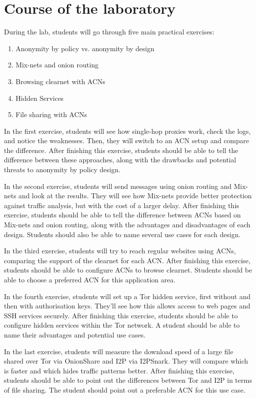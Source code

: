 \section{Course of the laboratory}
During the lab, students will go through five main practical exercises:
\begin{enumerate}
    \item Anonymity by policy vs. anonymity by design
    \item Mix-nets and onion routing
    \item Browsing clearnet with ACNs
    \item Hidden Services
    \item File sharing with ACNs
\end{enumerate}

In the first exercise, students will see how single-hop proxies work, check the logs, and notice the weaknesses. Then, they will switch to an ACN setup and compare the difference. After finishing this exercise, students should be able to tell the difference between these approaches, along with the drawbacks and potential threats to anonymity by policy design.

In the second exercise, students will send messages using onion routing and Mix-nets and look at the results. They will see how Mix-nets provide better protection against traffic analysis, but with the cost of a larger delay. After finishing this exercise, students should be able to tell the difference between ACNs based on Mix-nets and onion routing, along with the advantages and disadvantages of each design. Students should also be able to name several use cases for each design.

In the third exercise, students will try to reach regular websites using ACNs, comparing the support of the clearnet for each ACN. After finishing this exercise, students should be able to configure ACNs to browse clearnet. Students should be able to choose a preferred ACN for this application area.

In the fourth exercise, students will set up a Tor hidden service, first without and then with authorisation keys. They’ll see how this allows access to web pages and SSH services securely. After finishing this exercise, students should be able to configure hidden services within the Tor network. A student should be able to name their advantages and potential use cases.

In the last exercise, students will measure the download speed of a large file shared over Tor via OnionShare and I2P via I2PSnark. They will compare which is faster and which hides traffic patterns better. After finishing this exercise, students should be able to point out the differences between Tor and I2P in terms of file sharing. The student should point out a preferable ACN for this use case.


